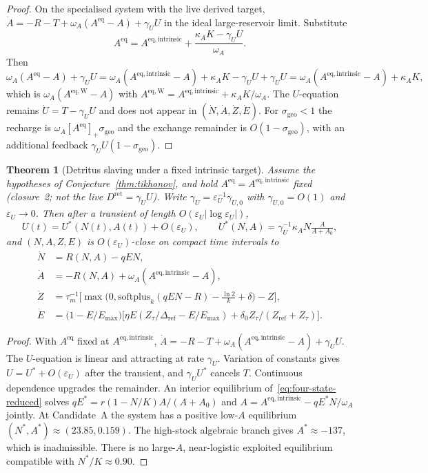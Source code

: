 \documentclass[11pt]{article}
\newtheorem{theorem}{Theorem}
\theoremstyle{definition}
\begin{document}
\begin{proof}
On the specialised system with the live derived target, $\dot A=-R-T+\omega_A(A^{\mathrm{eq}}-A)+\gamma_U U$ in the ideal large-reservoir limit. Substitute
\[
A^{\mathrm{eq}}=A^{\mathrm{eq,intrinsic}}+\frac{\kappa_A K-\gamma_U U}{\omega_A}.
\]
Then
\[
\omega_A(A^{\mathrm{eq}}-A)+\gamma_U U
=\omega_A(A^{\mathrm{eq,intrinsic}}-A)+\kappa_A K-\gamma_U U+\gamma_U U
=\omega_A(A^{\mathrm{eq,intrinsic}}-A)+\kappa_A K,
\]
which is $\omega_A(A^{\mathrm{eq,W}}-A)$ with $A^{\mathrm{eq,W}}=A^{\mathrm{eq,intrinsic}}+\kappa_A K/\omega_A$. The $U$-equation remains $\dot U=T-\gamma_U U$ and does not appear in $(\dot N,\dot A,\dot Z,\dot E)$. For $\sigma_{\mathrm{geo}}<1$ the recharge is $\omega_A[A^{\mathrm{eq}}]_+\sigma_{\mathrm{geo}}$ and the exchange remainder is $O(1-\sigma_{\mathrm{geo}})$, with an additional feedback $\gamma_U U(1-\sigma_{\mathrm{geo}})$.
\end{proof}

\begin{theorem}[Detritus slaving under a fixed intrinsic target]
\label{thm:detritus}
Assume the hypotheses of Conjecture~\ref{thm:tikhonov}, and hold $A^{\mathrm{eq}}=A^{\mathrm{eq,intrinsic}}$ \emph{fixed} (closure~2; not the live $D^{\mathrm{ret}}=\gamma_U U$). Write $\gamma_U=\varepsilon_U^{-1}\gamma_{U,0}$ with $\gamma_{U,0}=O(1)$ and $\varepsilon_U\to 0$. Then after a transient of length $O(\varepsilon_U|\log\varepsilon_U|)$,
\[
U(t)=U^*(N(t),A(t))+O(\varepsilon_U),\qquad
U^*(N,A)=\gamma_U^{-1}\kappa_A N\tfrac{A}{A+A_0},
\]
and $(N,A,Z,E)$ is $O(\varepsilon_U)$-close on compact time intervals to
\begin{equation}
\begin{aligned}
\dot N&=R(N,A)-qEN,\\
\dot A&=-R(N,A)+\omega_A(A^{\mathrm{eq,intrinsic}}-A),\\
\dot Z&=\tau_m^{-1}\bigl[\max\bigl(0,\mathrm{softplus}_k(qEN-R)-\tfrac{\ln 2}{k}+\delta\bigr)-Z\bigr],\\
\dot E&=\bigl(1-E/E_{\max}\bigr)\bigl[\eta E(Z_\tau/\Delta_{\mathrm{ref}}-E/E_{\max})+\delta_0 Z_\tau/(Z_{\mathrm{ref}}+Z_\tau)\bigr].
\end{aligned}
\label{eq:four-state-reduced}
\end{equation}
\end{theorem}

\begin{proof}
With $A^{\mathrm{eq}}$ fixed at $A^{\mathrm{eq,intrinsic}}$, $\dot A=-R-T+\omega_A(A^{\mathrm{eq,intrinsic}}-A)+\gamma_U U$. The $U$-equation is linear and attracting at rate $\gamma_U$. Variation of constants gives $U=U^*+O(\varepsilon_U)$ after the transient, and $\gamma_U U^*$ cancels $T$. Continuous dependence upgrades the remainder. An interior equilibrium of~\eqref{eq:four-state-reduced} solves $qE^*=r(1-N/K)A/(A+A_0)$ and $A=A^{\mathrm{eq,intrinsic}}-qE^*N/\omega_A$ jointly. At Candidate~A the system has a positive low-$A$ equilibrium $(N^*,A^*)\approx(23.85,0.159)$. The high-stock algebraic branch gives $A^*\approx-137$, which is inadmissible. There is no large-$A$, near-logistic exploited equilibrium compatible with $N^*/K\approx 0.90$.
\end{proof}
\end{document}
